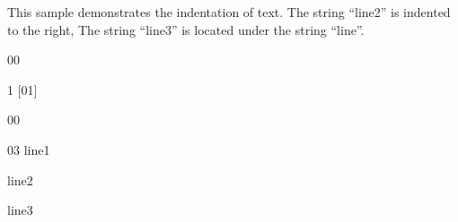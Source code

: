 \documentclass{article}
\begin{document}
\noindent
This sample demonstrates the indentation of text. The string ``line2'' is
indented to the right, The string ``line3'' is located under the string
``line''.
\vspace{2cm}

\begin{boxenv}
\begin{VBOX}{0}{0}
\begin{HBOX}{1}%
[01]~\begin{VBOX}{0}{0}
\begin{VBOX}{0}{3}
line1

line2
\end{VBOX}

line3
\end{VBOX}

\end{HBOX}
\end{VBOX}
\end{boxenv}
\end{document}
